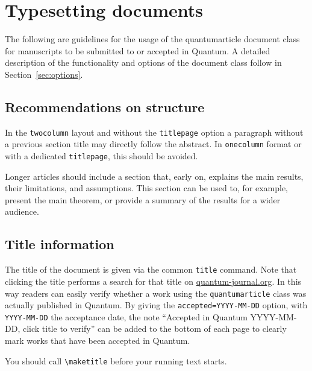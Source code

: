 \documentclass[a4paper,noarxiv,onecolumn]{quantumarticle}
\begin{document}
	\section{Typesetting documents}

        The following are guidelines for the usage of the quantumarticle document class for manuscripts to be submitted to or accepted in Quantum. A detailed description of the functionality and options of the document class follow in Section~\ref{sec:options}.
        
	\subsection{Recommendations on structure}	
	In the \texttt{twocolumn} layout and without the \texttt{titlepage} option a paragraph without a previous section title may directly follow the abstract.
	In \texttt{onecolumn} format or with a dedicated \texttt{titlepage}, this should be avoided.
	
	Longer articles should include a section that, early on, explains the main results, their limitations, and assumptions.
	This section can be used to, for example, present the main theorem, or provide a summary of the results for a wider audience.
	
	\subsection{Title information}
	The title of the document is given via the common \texttt{title} command. Note that clicking the title performs a search for that title on \href{http://quantum-journal.org}{quantum-journal.org}.
	In this way readers can easily verify whether a work using the \texttt{quantumarticle} class was actually published in Quantum. By giving the \texttt{accepted=YYYY-MM-DD} option, with \texttt{YYYY-MM-DD} the acceptance date, the note ``Accepted in Quantum YYYY-MM-DD, click title to verify'' can be added to the bottom of each page to clearly mark works that have been accepted in Quantum. 	
	
	You should call \texttt{\textbackslash{}maketitle} before your running text starts.
	
\end{document}
